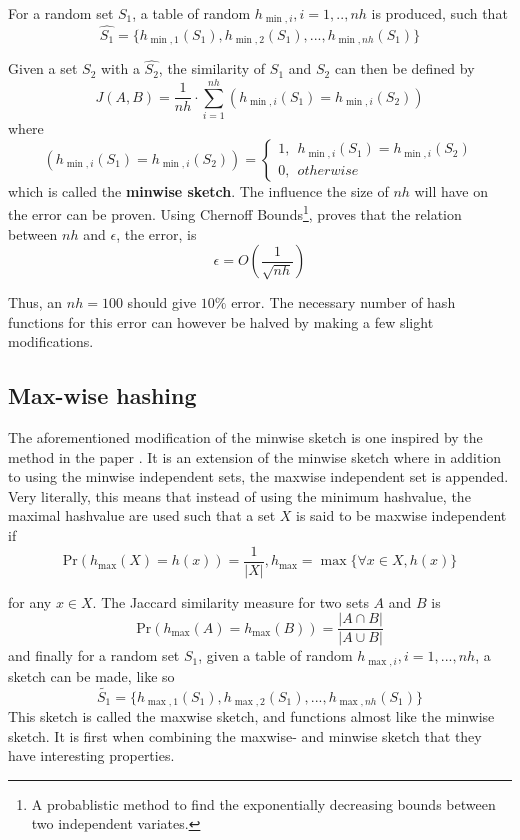 \documentclass[../../main.tex]{subfiles}
\begin{document}
For a random set $S_1$, a table of random $h_{\min,i},i=1,..,nh$ is produced, such that
$$
\hat{S_1} = \{ h_{\min,1}(S_1),h_{\min,2}(S_1),...,h_{\min,nh}(S_1)\}
$$

Given a set $S_2$ with a $\hat{S_2}$, the similarity of $S_1$ and $S_2$ can then be defined by
\begin{equation}\label{jacsketch}
J(A,B)=\frac{1}{nh}\cdot \sum_{i=1}^{nh} (h_{\min,i}(S_1) = h_{\min,i}(S_2))
\end{equation}
where
$$
(h_{\min,i}(S_1) = h_{\min,i}(S_2)) = \left\{ \begin{array}{ll}
												1, \ \ h_{\min,i}(S_1)=h_{\min,i}(S_2)\\
												0, \ \ otherwise
											  \end{array}\right.
$$
which is called the \textbf{minwise sketch}. The influence the size of $nh$ will have on the error can be proven. Using Chernoff Bounds\footnote{A probablistic method to find the exponentially decreasing bounds between two independent variates.}, \cite{errorMinhash} proves that the relation between $nh$ and $\epsilon$, the error, is 
\begin{equation}\label{minwiseerror}
\epsilon = O\left(\frac{1}{\sqrt{nh}}\right)
\end{equation}

Thus, an $nh = 100$ should give $10\%$ error. The necessary number of hash functions for this error can however be halved by making a few slight modifications.

\subsection{Max-wise hashing}

The aforementioned modification of the minwise sketch is one inspired by the method in the paper \cite{minmaxhash}. It is an extension of the minwise sketch where in addition to using the minwise independent sets, the maxwise independent set is appended. Very literally, this means that instead of using the minimum hashvalue, the maximal hashvalue are used such that a set $X$ is said to be maxwise independent if
\begin{equation}\label{maxwise}
\mathrm{Pr}(h_{\max}(X)=h(x))=\frac{1}{|X|}, h_{\max}=\max\{\forall x \in X, h(x)\} 
\end{equation}

for any $x\in X$. The Jaccard similarity measure for two sets $A$ and $B$ is
\begin{equation}\label{maxwisejaccard}
\mathrm{Pr}(h_{\max}(A)=h_{\max}(B))=\frac{|A\cap B|}{|A\cup B|}
\end{equation}
and finally for a random set $S_1$, given a table of random $h_{\max,i},i=1,...,nh$, a sketch can be made, like so
$$
\tilde{S_1} = \{ h_{\max,1}(S_1),h_{\max,2}(S_1),...,h_{\max,nh}(S_1)\}
$$
This sketch is called the maxwise sketch, and functions almost like the minwise sketch. It is first when combining the maxwise- and minwise sketch that they have interesting properties.
\end{document}
